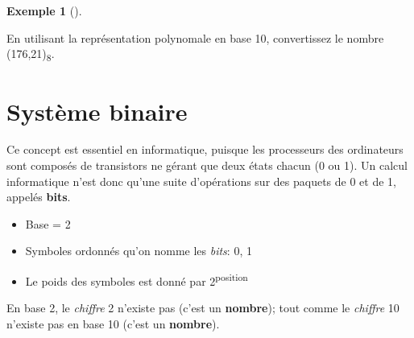 \documentclass[
  letterpaper,
]{scrbook}
\providecommand{\tightlist}{%
  \setlength{\itemsep}{0pt}\setlength{\parskip}{0pt}}\usepackage{longtable,booktabs,array}
\theoremstyle{definition}
\newtheorem{example}{Exemple}[chapter]
\theoremstyle{definition}
\theoremstyle{plain}
\theoremstyle{remark}
\begin{document}
\leavevmode{}%
\begin{example}[]\label{exm-octal-vers-decimal}

En utilisant la représentation polynomale en base 10, convertissez le
nombre (176,21)\textsubscript{8}.

\end{example}

\hypertarget{systuxe8me-binaire}{%
\section{Système binaire}\label{systuxe8me-binaire}}

Ce concept est essentiel en informatique, puisque les processeurs des
ordinateurs sont composés de transistors ne gérant que deux états chacun
(0 ou 1). Un calcul informatique n'est donc qu'une suite d'opérations
sur des paquets de 0 et de 1, appelés \textbf{bits}.

\begin{itemize}
\tightlist
\item
  Base = 2
\item
  Symboles ordonnés qu'on nomme les \emph{bits}: 0, 1
\item
  Le poids des symboles est donné par 2\textsuperscript{position}
\end{itemize}

\begin{tcolorbox}[enhanced jigsaw, colframe=quarto-callout-important-color-frame, bottomtitle=1mm, coltitle=black, breakable, arc=.35mm, title=\textcolor{quarto-callout-important-color}{\faExclamation}\hspace{0.5em}{Important}, opacitybacktitle=0.6, colback=white, opacityback=0, colbacktitle=quarto-callout-important-color!10!white, leftrule=.75mm, rightrule=.15mm, titlerule=0mm, toprule=.15mm, toptitle=1mm, left=2mm, bottomrule=.15mm]

En base 2, le \emph{chiffre} 2 n'existe pas (c'est un \textbf{nombre});
tout comme le \emph{chiffre} 10 n'existe pas en base 10 (c'est un
\textbf{nombre}).

\end{tcolorbox}
\end{document}
